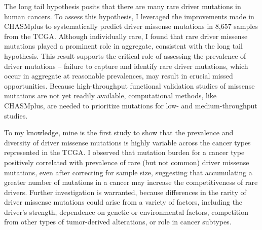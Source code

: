 The long tail hypothesis \cite{RN27, RN35} posits that there are many rare driver mutations in human cancers. To assess this hypothesis, I leveraged the improvements made in CHASMplus to systematically predict driver missense mutations in 8,657 samples from the TCGA. Although individually rare, I found that rare driver missense mutations played a prominent role in aggregate, consistent with the long tail hypothesis. This result supports the critical role of assessing the prevalence of driver mutations -- failure to capture and identify rare driver mutations, which occur in aggregate at reasonable prevalences, may result in crucial missed opportunities.   Because high-throughput functional validation studies of missense mutations are not yet readily available, computational methods, like CHASMplus, are needed to prioritize mutations for low- and medium-throughput studies. 

To my knowledge, mine is the first study to show that the prevalence and diversity of driver missense mutations is highly variable across the cancer types represented in the TCGA.  I observed that mutation burden for a cancer type positively correlated with prevalence of rare (but not common) driver missense mutations, even after correcting for sample size, suggesting that accumulating a greater number of mutations in a cancer may increase the competitiveness of rare drivers. Further investigation is warranted, because differences in the rarity of driver missense mutations could arise from a variety of factors, including the driver's strength, dependence on genetic or environmental factors, competition from other types of tumor-derived alterations, or role in cancer subtypes.
